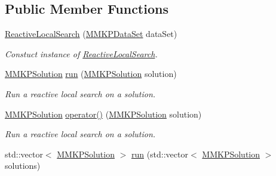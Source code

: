 \subsection*{Public Member Functions}
\begin{DoxyCompactItemize}
\item 
\hypertarget{class_reactive_local_search_a6e231ce3aa59fb6f97a545b7f4fb4e40}{\hyperlink{class_reactive_local_search_a6e231ce3aa59fb6f97a545b7f4fb4e40}{Reactive\+Local\+Search} (\hyperlink{class_m_m_k_p_data_set}{M\+M\+K\+P\+Data\+Set} data\+Set)}\label{class_reactive_local_search_a6e231ce3aa59fb6f97a545b7f4fb4e40}

\begin{DoxyCompactList}\small\item\em Constuct instance of \hyperlink{class_reactive_local_search}{Reactive\+Local\+Search}. \end{DoxyCompactList}\item 
\hypertarget{class_reactive_local_search_a4a3bbb246bb8b9f9ce36a23978e1793b}{\hyperlink{class_m_m_k_p_solution}{M\+M\+K\+P\+Solution} \hyperlink{class_reactive_local_search_a4a3bbb246bb8b9f9ce36a23978e1793b}{run} (\hyperlink{class_m_m_k_p_solution}{M\+M\+K\+P\+Solution} solution)}\label{class_reactive_local_search_a4a3bbb246bb8b9f9ce36a23978e1793b}

\begin{DoxyCompactList}\small\item\em Run a reactive local search on a solution. \end{DoxyCompactList}\item 
\hypertarget{class_reactive_local_search_abea3950b439f57d3148d5dd241a0f734}{\hyperlink{class_m_m_k_p_solution}{M\+M\+K\+P\+Solution} \hyperlink{class_reactive_local_search_abea3950b439f57d3148d5dd241a0f734}{operator()} (\hyperlink{class_m_m_k_p_solution}{M\+M\+K\+P\+Solution} solution)}\label{class_reactive_local_search_abea3950b439f57d3148d5dd241a0f734}

\begin{DoxyCompactList}\small\item\em Run a reactive local search on a solution. \end{DoxyCompactList}\item 
\hypertarget{class_reactive_local_search_a98f2b0078ac88a23e387c84b23973a22}{std\+::vector$<$ \hyperlink{class_m_m_k_p_solution}{M\+M\+K\+P\+Solution} $>$ \hyperlink{class_reactive_local_search_a98f2b0078ac88a23e387c84b23973a22}{run} (std\+::vector$<$ \hyperlink{class_m_m_k_p_solution}{M\+M\+K\+P\+Solution} $>$ solutions)}\label{class_reactive_local_search_a98f2b0078ac88a23e387c84b23973a22}


\end{DoxyCompactItemize}
